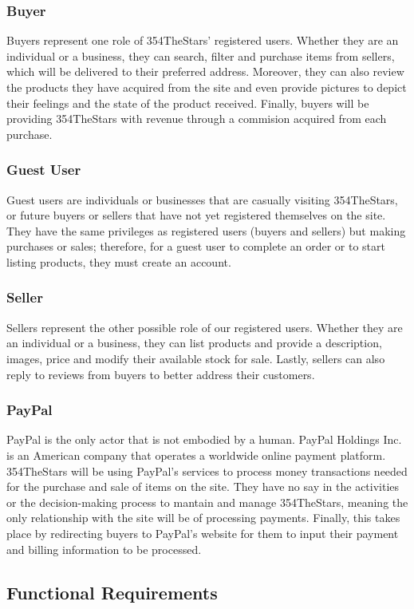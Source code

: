 \documentclass[11pt]{article}
\newcounter{use case ID}
\newcounter{req ID}
\begin{document}
\subsubsection{Buyer}
Buyers represent one role of 354TheStars' registered users. Whether they are
an individual or a business, they can search, filter and purchase items from sellers,
which will be delivered to their preferred address. Moreover, they can also review
the products they have acquired from the site and even provide pictures to depict
their feelings and the state of the product received. Finally, buyers will be providing
354TheStars with revenue through a commision acquired from each purchase.
\subsubsection{Guest User}
Guest users are individuals or businesses that are casually visiting 354TheStars,
or future buyers or sellers that have not yet registered themselves on the site.
They have the same privileges as registered users (buyers and sellers) but making
purchases or sales; therefore, for a guest user to complete an order or
to start listing products, they must create an account.
\subsubsection{Seller}
Sellers represent the other possible role of our registered users. Whether they are
an individual or a business, they can list products and provide a description,
images, price and modify their available stock for sale. Lastly, sellers can also
reply to reviews from buyers to better address their customers.
\subsubsection{PayPal}
PayPal is the only actor that is not embodied by a human. PayPal Holdings Inc. is
an American company that operates a worldwide online payment platform. 354TheStars
will be using PayPal's services to process money transactions needed for the purchase
and sale of items on the site. They have no say in the activities or the
decision-making process to mantain and manage 354TheStars, meaning the only
relationship with the site will be of processing payments. Finally, this takes
place by redirecting buyers to PayPal's website for them to input their payment
and billing information to be processed.



\subsection{Functional Requirements} \label{func req}
\end{document}
